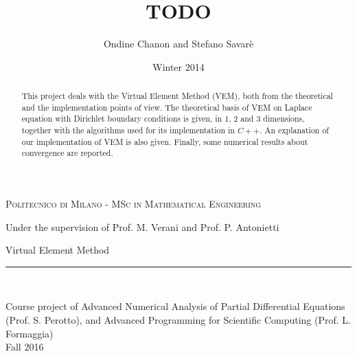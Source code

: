 \documentclass[letter,11pt]{article}
\title{TODO} %
\author{Ondine Chanon and Stefano Savarè} %
\date{Winter 2014}
\begin{document}
\begin{titlepage}


\begin{center}
\textsc{Politecnico di Milano - MSc in Mathematical Engineering}

Under the supervision of Prof. M. Verani and Prof. P. Antonietti
\end{center}

\vfill


\begin{center}
\begin{Huge}
Virtual Element Method\\ 
\vspace{3mm}
\end{Huge}
\end{center}

\noindent\rule{\linewidth}{2pt}

\vspace{5mm}


~\vspace{1cm}


\vfill

\begin{center}
Course project of Advanced Numerical Analysis
of Partial Differential Equations (Prof. S. Perotto), and Advanced Programming for Scientific Computing (Prof. L. Formaggia)\\
\vspace{1cm}
Fall 2016
\end{center}

\end{titlepage}

~\vfill
\thispagestyle{empty}
\begin{abstract}
This project deals with the Virtual Element Method (VEM), both from the theoretical and the implementation points of view. The theoretical basis of VEM on Laplace equation with Dirichlet boundary conditions is given, in $1$, $2$ and $3$ dimensions, together with the algorithms used for its implementation in $C++$. An explanation of our implementation of VEM is also given. Finally, some numerical results about convergence are reported.
\end{abstract}
\end{document}
